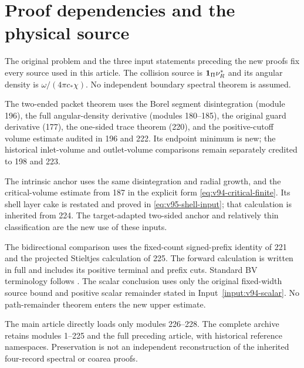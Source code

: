 \section{Proof dependencies and the physical source}
\label{app:v95-dependencies}
The original problem and the three input statements preceding the new
proofs fix every source used in this article. The collision source is
$\mathbf1_\Pi\nu_R^*$ and its angular density is
$\omega/(4\pi c_*\chi)$. No independent boundary spectral theorem is
assumed.

The two-ended packet theorem uses the Borel segment disintegration
(module 196), the full angular-density derivative (modules 180--185),
the original guard derivative (177), the one-sided trace theorem (220),
and the positive-cutoff volume estimate audited in 196 and 222.
Its endpoint minimum is new; the historical inlet-volume and
outlet-volume comparisons remain separately credited to 198 and 223.

The intrinsic anchor uses the same disintegration and radial growth,
and the critical-volume estimate from 187 in the explicit form
\eqref{eq:v94-critical-finite}. Its shell layer cake is restated and
proved in \eqref{eq:v95-shell-input}; that calculation is inherited
from 224. The target-adapted two-sided anchor and relatively thin
classification are the new use of these inputs.

The bidirectional comparison uses the fixed-count signed-prefix
identity of 221 and the projected Stieltjes calculation of 225.
The forward calculation is written in full and includes its positive
terminal and prefix cuts. Standard BV terminology follows \cite{AFP}.
The scalar conclusion uses only the original fixed-width source bound
and positive scalar remainder stated in Input~\ref{input:v94-scalar}.
No path-remainder theorem enters the new upper estimate.

The main article directly loads only modules 226--228. The complete
archive retains modules 1--225 and the full preceding article, with
historical reference namespaces. Preservation is not an independent
reconstruction of the inherited four-record spectral or coarea proofs.
